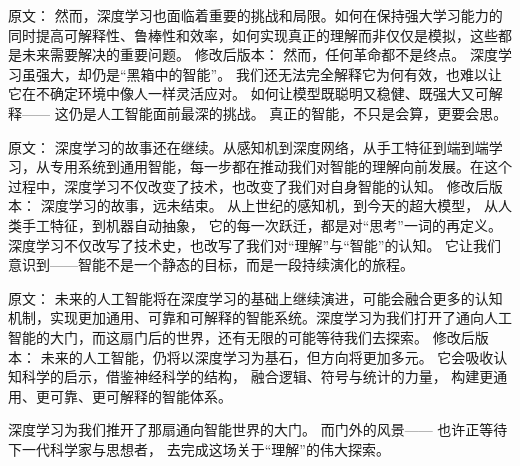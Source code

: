 原文：
然而，深度学习也面临着重要的挑战和局限。如何在保持强大学习能力的同时提高可解释性、鲁棒性和效率，如何实现真正的理解而非仅仅是模拟，这些都是未来需要解决的重要问题。
修改后版本：
然而，任何革命都不是终点。  
深度学习虽强大，却仍是“黑箱中的智能”。  
我们还无法完全解释它为何有效，也难以让它在不确定环境中像人一样灵活应对。  
如何让模型既聪明又稳健、既强大又可解释——  
这仍是人工智能面前最深的挑战。  
真正的智能，不只是会算，更要会思。



原文：
深度学习的故事还在继续。从感知机到深度网络，从手工特征到端到端学习，从专用系统到通用智能，每一步都在推动我们对智能的理解向前发展。在这个过程中，深度学习不仅改变了技术，也改变了我们对自身智能的认知。
修改后版本：
深度学习的故事，远未结束。  
从上世纪的感知机，到今天的超大模型，  
从人类手工特征，到机器自动抽象，  
它的每一次跃迁，都是对“思考”一词的再定义。  
深度学习不仅改写了技术史，也改写了我们对“理解”与“智能”的认知。  
它让我们意识到——智能不是一个静态的目标，而是一段持续演化的旅程。



原文：
未来的人工智能将在深度学习的基础上继续演进，可能会融合更多的认知机制，实现更加通用、可靠和可解释的智能系统。深度学习为我们打开了通向人工智能的大门，而这扇门后的世界，还有无限的可能等待我们去探索。
修改后版本：
未来的人工智能，仍将以深度学习为基石，但方向将更加多元。  
它会吸收认知科学的启示，借鉴神经科学的结构，  
融合逻辑、符号与统计的力量，  
构建更通用、更可靠、更可解释的智能体系。  

深度学习为我们推开了那扇通向智能世界的大门。  
而门外的风景——  
也许正等待下一代科学家与思想者，  
去完成这场关于“理解”的伟大探索。



